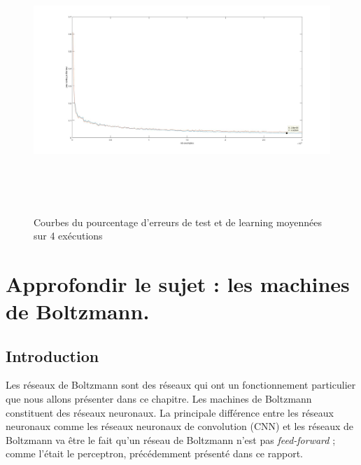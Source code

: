 \documentclass[a4paper,oneside]{report}
\begin{document}
\begin{figure}[!h]
	\begin{center}
		\includegraphics[width=17cm,height=10cm]{Images/courbes_moyennes.jpg} 
		\caption{Courbes du pourcentage d'erreurs de test et de learning moyennées sur 4 exécutions} 
	\end{center}
\end{figure}






\newpage


    \part[Machines de Boltzmann]{Approfondir le sujet : les machines de Boltzmann.}

        \chapter{Introduction}

            Les réseaux de Boltzmann sont des réseaux qui ont un fonctionnement
            particulier que nous allons présenter dans ce chapitre. Les machines de
            Boltzmann constituent des réseaux neuronaux. La principale différence entre
            les réseaux neuronaux comme les réseaux neuronaux de convolution (CNN) et
            les  réseaux de Boltzmann va être le fait qu'un réseau de Boltzmann n'est
            pas \textit{feed-forward} ; comme l'était le perceptron, précédemment présenté dans ce
            rapport.
\end{document}
